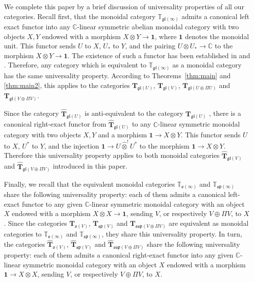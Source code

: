 \documentclass[12pt,reqno]{amsart}
\theoremstyle{definition}
\theoremstyle{remark}
\begin{document}
We complete this paper by a brief discussion of universality properties of all our categories. Recall first, that the monoidal category $\mathbb{T}_{\mathfrak{gl}(\infty)}$ admits a canonical left exact functor into any $\mathbb{C}$-linear symmetric abelian monoidal category with two objects $X,Y$ endowed with a morphism $X\otimes Y \rightarrow \mathbf{1}$, where $\mathbf{1}$ denotes the monoidal unit. This functor sends $U$ to $X$, $U_\ast$ to $Y$, and the pairing $U\otimes U_\ast \rightarrow \mathbb{C}$ to the morphism $X\otimes Y \rightarrow \mathbf{1}$. The existence of such a functor has been established in \cite{SS} and \cite{DPS}. Therefore, any category which is equivalent to $\mathbb{T}_{\mathfrak{gl}(\infty)}$ as a monoidal category has the same universality property. According to Theorems~\ref{thm:main} and \ref{thm:main2}, this applies to the categories 
$\mathbf{T}_{\mathfrak{gl}(U)}$, $\mathbf{T}_{\mathfrak{gl}(V)}$, $\mathbf{T}_{\mathfrak{gl}(U\oplus \Pi U)}$ and $\mathbf{T}_{\mathfrak{gl}(V\oplus \Pi V)}$.

Since the category $\widehat{\mathbf{T}}_{\mathfrak{gl}(U)}$ is anti-equivalent to the category $\mathbf{T}_{\mathfrak{gl}(U)}$ \cite{EP}, there is a canonical right-exact functor from $\widehat{\mathbf{T}}_{\mathfrak{gl}(U)}$ to any $\mathbb{C}$-linear symmetric monoidal category with two objects $X,Y$ and a morphism $\mathbf{1}\rightarrow X\otimes Y$.
This functor sends $U$ to $X$, $U^\ast$ to $Y$, and the injection $\mathbf{1}\rightarrow U\widehat{\otimes}^! U^\ast$ to the morphism $\mathbf{1}\rightarrow X\otimes Y$.
Therefore this universality property applies to both monoidal categories $\widehat{\mathbf{T}}_{\mathfrak{gl}(V)}$ and 
$\widehat{\mathbf{T}}_{\mathfrak{gl}(V\oplus \Pi V)}$ introduced in this paper.

Finally, we recall that the equivalent monoidal categories $\mathbb{T}_{\mathfrak{o}(\infty)}$ and $\mathbb{T}_{\mathfrak{sp}(\infty)}$ share the following universality property: each of them admits a canonical left-exact functor to any given $\mathbb{C}$-linear symmetric monoidal category with an object $X$ endowed with a morphism $X\otimes X \rightarrow \mathbf{1}$,
sending $V$, or respectively $V\oplus \Pi V$, to $X$. Since the categories $\mathbf{T}_{\mathfrak{o}(V)}$, $\mathbf{T}_{\mathfrak{sp}(V)}$ and $\mathbf{T}_{\mathfrak{osp}(V\oplus \Pi V)}$ are equivalent as monoidal categories to $\mathbb{T}_{\mathfrak{o}(\infty)}$ and $\mathbb{T}_{\mathfrak{sp}(\infty)}$, they share this universality property. 
In turn, the categories $\widehat{\mathbf{T}}_{\mathfrak{o}(V)}$, $\widehat{\mathbf{T}}_{\mathfrak{sp}(V)}$ and $\widehat{\mathbf{T}}_{\mathfrak{osp}(V \oplus \Pi V)}$ share the following universality property: each of them admits a canonical right-exact functor into any given $\mathbb{C}$-linear symmetric monoidal category with an object $X$ endowed with a morphism $ \mathbf{1} \rightarrow X\otimes X $, sending $V$, or respectively $V\oplus \Pi V$, to $X$.
\end{document}
